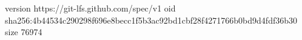 version https://git-lfs.github.com/spec/v1
oid sha256:4b44534c290298f696e8becc1f5b3ac92bd1cbf28f4271766b0bd9d4fdf36b30
size 76974

